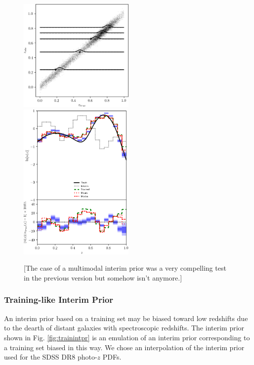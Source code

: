 \documentclass[iop]{emulateapj}
\begin{document}
\begin{figure}
	\begin{center}
		\includegraphics[width=0.5\textwidth]{fig/template_prior/scatter.png}\\
		\includegraphics[width=0.5\textwidth]{fig/template_prior/estimators.png}	
		\caption{[The case of a multimodal interim prior was a very compelling test in the previous version but somehow isn't anymore.]}
		\label{fig:tempintpr}
	\end{center}
\end{figure}

\subsubsection{Training-like Interim Prior}
\label{sec:trainintpr}

An interim prior based on a training set may be biased toward low redshifts due to the dearth of distant galaxies with spectroscopic redshifts.  The interim prior shown in Fig. \ref{fig:trainintpr} is an emulation of an interim prior corresponding to a training set biased in this way.  We chose an interpolation of the interim prior used for the SDSS DR8 photo-$z$ PDFs.  
\end{document}
